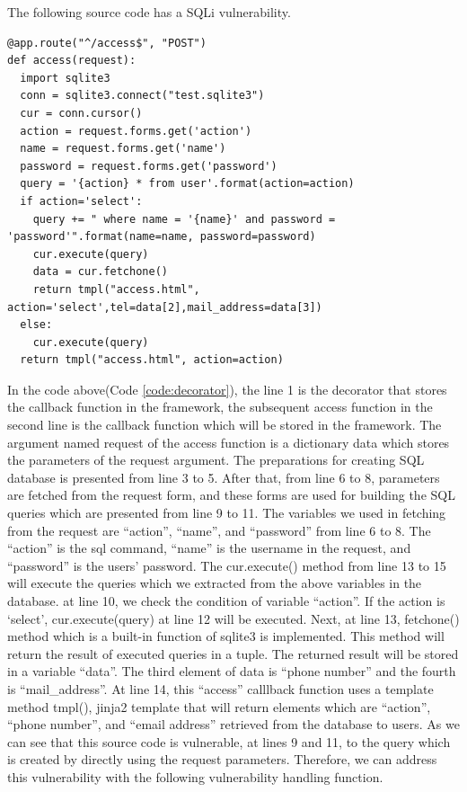 \documentclass[conference]{IEEEtran}
\begin{document}
The following source code has a SQLi vulnerability.
\begin{lstlisting}[caption={A vulnerable function which has a SQL injection.}, label=code:decorator, captionpos=b]
@app.route("^/access$", "POST")
def access(request):
  import sqlite3
  conn = sqlite3.connect("test.sqlite3")
  cur = conn.cursor()
  action = request.forms.get('action')
  name = request.forms.get('name')
  password = request.forms.get('password')
  query = '{action} * from user'.format(action=action)
  if action='select':
    query += " where name = '{name}' and password = 'password'".format(name=name, password=password)
    cur.execute(query)
    data = cur.fetchone()
    return tmpl("access.html", action='select',tel=data[2],mail_address=data[3])
  else:
    cur.execute(query)
  return tmpl("access.html", action=action)
\end{lstlisting}

In the code above(Code \ref{code:decorator}), the line 1 is the decorator that stores the callback function in the framework, the subsequent access function in the second line is the callback function which will be stored in the framework.
The argument named request of the access function is a dictionary data which stores the parameters of the request argument.
The preparations for creating SQL database is presented from line 3 to 5.
After that, from line 6 to 8, parameters are fetched from the request form, and these forms are used for building the SQL queries which are presented from line 9 to 11.
The variables we used in fetching from the request are ``action'', ``name'', and “password” from line 6 to 8. The “action” is the sql command, “name” is the username in the request, and “password” is the users’ password.
The cur.execute() method from line 13 to 15 will execute the queries which we extracted from the above variables in the database.
at line 10, we check the condition of variable “action”. If the action is ‘select’, cur.execute(query) at line 12 will be executed.
Next, at line 13, fetchone() method which is a built-in function of sqlite3 is implemented. This method will return the result of executed queries in a tuple. The returned result will be stored in a variable “data”. The third element of data is “phone number” and the fourth is “mail\_address”.
At line 14, this “access” calllback function uses a template method tmpl(), jinja2 template that will return elements which are “action”, “phone number”, and “email address” retrieved from the database to users.
As we can see that this source code is vulnerable, at lines 9 and 11, to the query which is created by directly using the request parameters.
Therefore, we can address this vulnerability with the following vulnerability handling function.
\end{document}
